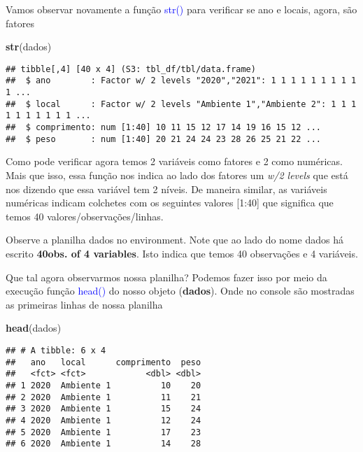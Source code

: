\documentclass[14pt,titlepage, oneside, openany, a4paper]{book}
\newenvironment{Shaded}{\begin{snugshade}}{\end{snugshade}}
\newcommand{\KeywordTok}[1]{\textcolor[rgb]{0.13,0.29,0.53}{\textbf{#1}}}
\newcommand{\NormalTok}[1]{#1}
\begin{document}
Vamos observar novamente a função \textcolor{blue}{str()} para verificar se ano e locais, agora, são fatores

\begin{Shaded}
\begin{Highlighting}[]
\KeywordTok{str}\NormalTok{(dados)}
\end{Highlighting}
\end{Shaded}

\begin{verbatim}
## tibble[,4] [40 x 4] (S3: tbl_df/tbl/data.frame)
##  $ ano        : Factor w/ 2 levels "2020","2021": 1 1 1 1 1 1 1 1 1 1 ...
##  $ local      : Factor w/ 2 levels "Ambiente 1","Ambiente 2": 1 1 1 1 1 1 1 1 1 1 ...
##  $ comprimento: num [1:40] 10 11 15 12 17 14 19 16 15 12 ...
##  $ peso       : num [1:40] 20 21 24 24 23 28 26 25 21 22 ...
\end{verbatim}

Como pode verificar agora temos 2 variáveis como fatores e 2 como numéricas. Mais que isso, essa função nos indica ao lado dos fatores um \emph{w/2 levels} que está nos dizendo que essa variável tem 2 níveis. De maneira similar, as variáveis numéricas indicam colchetes com os seguintes valores {[}1:40{]} que significa que temos 40 valores/observações/linhas.

Observe a planilha dados no environment. Note que ao lado do nome dados há escrito \textbf{40obs. of 4 variables}. Isto indica que temos 40 observações e 4 variáveis.

Que tal agora observarmos nossa planilha? Podemos fazer isso por meio da execução função \textcolor{blue}{head()} do nosso objeto (\textbf{dados}). Onde no console são mostradas as primeiras linhas de nossa planilha

\begin{Shaded}
\begin{Highlighting}[]
\KeywordTok{head}\NormalTok{(dados)}
\end{Highlighting}
\end{Shaded}

\begin{verbatim}
## # A tibble: 6 x 4
##   ano   local      comprimento  peso
##   <fct> <fct>            <dbl> <dbl>
## 1 2020  Ambiente 1          10    20
## 2 2020  Ambiente 1          11    21
## 3 2020  Ambiente 1          15    24
## 4 2020  Ambiente 1          12    24
## 5 2020  Ambiente 1          17    23
## 6 2020  Ambiente 1          14    28
\end{verbatim}
\end{document}
